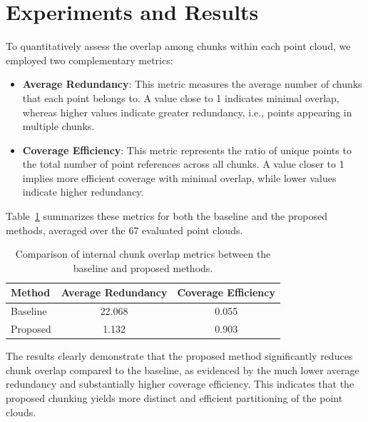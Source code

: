 \section{Experiments and Results}

To quantitatively assess the overlap among chunks within each point cloud, we employed two complementary metrics:

\begin{itemize}
    \item \textbf{Average Redundancy}: This metric measures the average number of chunks that each point belongs to. A value close to 1 indicates minimal overlap, whereas higher values indicate greater redundancy, i.e., points appearing in multiple chunks.
    \item \textbf{Coverage Efficiency}: This metric represents the ratio of unique points to the total number of point references across all chunks. A value closer to 1 implies more efficient coverage with minimal overlap, while lower values indicate higher redundancy.
\end{itemize}

Table~\ref{tab:overlap_metrics} summarizes these metrics for both the baseline and the proposed methods, averaged over the 67 evaluated point clouds.

\begin{table}[h]
\centering
\caption{Comparison of internal chunk overlap metrics between the baseline and proposed methods.}
\label{tab:overlap_metrics}
\begin{tabular}{lcc}
\toprule
\textbf{Method} & \textbf{Average Redundancy} & \textbf{Coverage Efficiency} \\
\midrule
Baseline & 22.068 & 0.055 \\
Proposed & 1.132  & 0.903 \\
\bottomrule
\end{tabular}
\end{table}

The results clearly demonstrate that the proposed method significantly reduces chunk overlap compared to the baseline, as evidenced by the much lower average redundancy and substantially higher coverage efficiency. This indicates that the proposed chunking yields more distinct and efficient partitioning of the point clouds.
